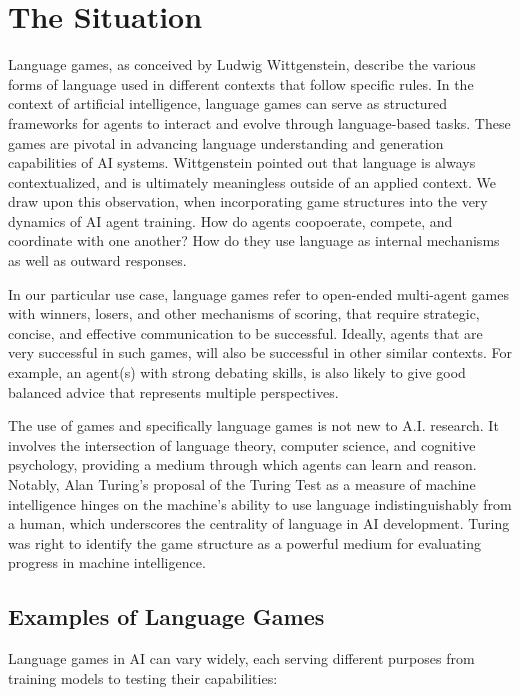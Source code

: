\section{The Situation}

Language games, as conceived by Ludwig Wittgenstein, describe the various forms of language used in different contexts that follow specific rules. In the context of artificial intelligence, language games can serve as structured frameworks for agents to interact and evolve through language-based tasks. These games are pivotal in advancing language understanding and generation capabilities of AI systems. Wittgenstein pointed out that language is always contextualized, and is ultimately meaningless outside of an applied context. We draw upon this observation, when incorporating game structures into the very dynamics of AI agent training. How do agents coopoerate, compete, and coordinate with one another? How do they use language as internal mechanisms as well as outward responses.

In our particular use case, language games refer to open-ended multi-agent games with winners, losers, and other mechanisms of scoring, that require strategic, concise, and effective communication to be successful. Ideally, agents that are very successful in such games, will also be successful in other similar contexts. For example, an agent(s) with strong debating skills, is also likely to give good balanced advice that represents multiple perspectives.

The use of games and specifically language games is not new to A.I. research. It involves the intersection of language theory, computer science, and cognitive psychology, providing a medium through which agents can learn and reason. Notably, Alan Turing's proposal of the Turing Test as a measure of machine intelligence hinges on the machine's ability to use language indistinguishably from a human, which underscores the centrality of language in AI development. Turing was right to identify the game structure as a powerful medium for evaluating progress in machine intelligence.

\subsection{Examples of Language Games}

Language games in AI can vary widely, each serving different purposes from training models to testing their capabilities:

